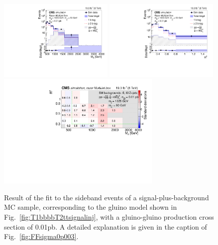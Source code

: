 \begin{figure}[htb!]
\centering
\includegraphics[width=0.49\textwidth]{figs/analysis8TeV/MR_T1bbbb_0p01_MultiJet.pdf}
\includegraphics[width=0.49\textwidth]{figs/analysis8TeV/RSQ_T1bbbb_0p01_MultiJet.pdf}
\includegraphics[width=0.7\textwidth]{figs/analysis8TeV/nSigmaLog_0p01_MultiJet.pdf}
\caption{Result of the fit to the sideband events of a
  signal-plus-background MC sample, corresponding to the gluino model
  shown in Fig.~\ref{fig:T1bbbbT2ttsignalinj}, with a gluino-gluino production cross section of 0.01\unit{pb}. A detailed explanation is
  given in the caption of Fig.~\ref{fig:FFsigma0p003}.\label{fig:FFsigma0p01}}
\end{figure}

